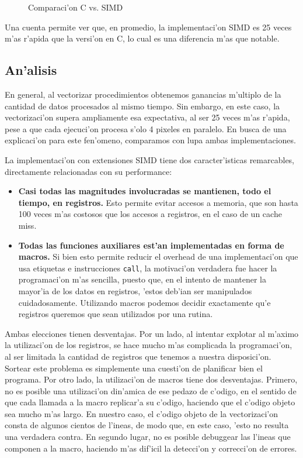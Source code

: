 \begin{figure}[H]
	\begin{center}
	\end{center}		
	\caption{Comparaci'on C vs. SIMD}
	\label{fig9}
\end{figure}

Una cuenta permite ver que, en promedio, la implementaci'on SIMD es 25 veces m'as r'apida que la versi'on en C, lo cual es una diferencia m'as que notable.

\subsection{An'alisis}

En general, al vectorizar procedimientos obtenemos ganancias m'ultiplo de la cantidad de datos procesados al mismo tiempo. Sin embargo, en este caso, la vectorizaci'on supera ampliamente esa expectativa, al ser 25 veces m'as r'apida, pese a que cada ejecuci'on procesa s'olo 4 pixeles en paralelo. En busca de una explicaci'on para este fen'omeno, comparamos con lupa ambas implementaciones.

La implementaci'on con extensiones SIMD tiene dos caracter'isticas remarcables, directamente relacionadas con su performance:

\begin{itemize}
	\item \textbf{Casi todas las magnitudes involucradas se mantienen, todo el tiempo, en registros.} Esto permite evitar accesos a memoria, que son hasta 100 veces m'as costosos que los accesos a registros, en el caso de un cache miss.
	\item \textbf{Todas las funciones auxiliares est'an implementadas en forma de macros.} Si bien esto permite reducir el overhead de una implementaci'on que usa etiquetas e instrucciones \texttt{call}, la motivaci'on verdadera fue hacer la programaci'on m'as sencilla, puesto que, en el intento de mantener la mayor'ia de los datos en registros, 'estos deb'ian ser manipulados cuidadosamente. Utilizando macros podemos decidir exactamente qu'e registros queremos que sean utilizados por una rutina.
\end{itemize}

Ambas elecciones tienen desventajas. Por un lado, al intentar explotar al m'aximo la utilizaci'on de los registros, se hace mucho m'as complicada la programaci'on, al ser limitada la cantidad de registros que tenemos a nuestra disposici'on. Sortear este problema es simplemente una cuesti'on de planificar bien el programa. Por otro lado, la utilizaci'on de macros tiene dos desventajas. Primero, no es posible una utilizaci'on din'amica de ese pedazo de c'odigo, en el sentido de que cada llamada a la macro replicar'a su c'odigo, haciendo que el c'odigo objeto sea mucho m'as largo. En nuestro caso, el c'odigo objeto de la vectorizaci'on consta de algunos cientos de l'ineas, de modo que, en este caso, 'esto no resulta una verdadera contra. En segundo lugar, no es posible debuggear las l'ineas que componen a la macro, haciendo m'as dif'icil la detecci'on y correcci'on de errores.

